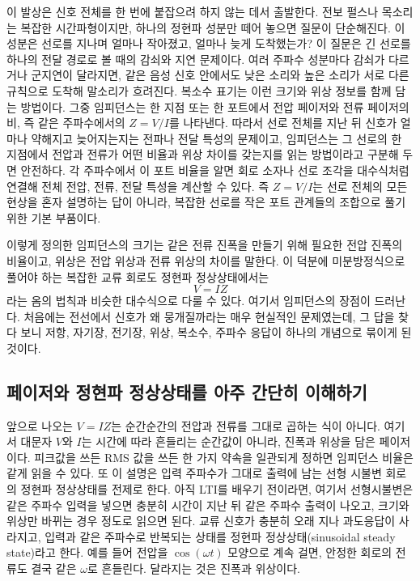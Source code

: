 이 발상은 신호 전체를 한 번에 붙잡으려 하지 않는 데서 출발한다.
전보 펄스나 목소리는 복잡한 시간파형이지만, 하나의 정현파 성분만 떼어 놓으면 질문이 단순해진다.
이 성분은 선로를 지나며 얼마나 작아졌고, 얼마나 늦게 도착했는가?
이 질문은 긴 선로를 하나의 전달 경로로 볼 때의 감쇠와 지연 문제이다.
여러 주파수 성분마다 감쇠가 다르거나 군지연이 달라지면, 같은 음성 신호 안에서도 낮은 소리와 높은 소리가 서로 다른 규칙으로 도착해 말소리가 흐려진다.
복소수 표기는 이런 크기와 위상 정보를 함께 담는 방법이다.
그중 임피던스는 한 지점 또는 한 포트에서 전압 페이저와 전류 페이저의 비, 즉 같은 주파수에서의 $Z=V/I$를 나타낸다.
따라서 선로 전체를 지난 뒤 신호가 얼마나 약해지고 늦어지는지는 전파나 전달 특성의 문제이고, 임피던스는 그 선로의 한 지점에서 전압과 전류가 어떤 비율과 위상 차이를 갖는지를 읽는 방법이라고 구분해 두면 안전하다.
각 주파수에서 이 포트 비율을 알면 회로 소자나 선로 조각을 대수식처럼 연결해 전체 전압, 전류, 전달 특성을 계산할 수 있다.
즉 $Z=V/I$는 선로 전체의 모든 현상을 혼자 설명하는 답이 아니라, 복잡한 선로를 작은 포트 관계들의 조합으로 풀기 위한 기본 부품이다.

이렇게 정의한 임피던스의 크기는 같은 전류 진폭을 만들기 위해 필요한 전압 진폭의 비율이고, 위상은 전압 위상과 전류 위상의 차이를 말한다.
이 덕분에 미분방정식으로 풀어야 하는 복잡한 교류 회로도 정현파 정상상태에서는
\begin{equation}
  V = IZ
\end{equation}
라는 옴의 법칙과 비슷한 대수식으로 다룰 수 있다.
여기서 임피던스의 장점이 드러난다.
처음에는 전선에서 신호가 왜 뭉개질까라는 매우 현실적인 문제였는데, 그 답을 찾다 보니 저항, 자기장, 전기장, 위상, 복소수, 주파수 응답이 하나의 개념으로 묶이게 된 것이다.

\subsection{페이저와 정현파 정상상태를 아주 간단히 이해하기}

앞으로 나오는 $V=IZ$는 순간순간의 전압과 전류를 그대로 곱하는 식이 아니다.
여기서 대문자 $V$와 $I$는 시간에 따라 흔들리는 순간값이 아니라, 진폭과 위상을 담은 페이저이다.
피크값을 쓰든 RMS 값을 쓰든 한 가지 약속을 일관되게 정하면 임피던스 비율은 같게 읽을 수 있다.
또 이 설명은 입력 주파수가 그대로 출력에 남는 선형 시불변 회로의 정현파 정상상태를 전제로 한다.
아직 LTI를 배우기 전이라면, 여기서 선형시불변은 같은 주파수 입력을 넣으면 충분히 시간이 지난 뒤 같은 주파수 출력이 나오고, 크기와 위상만 바뀌는 경우 정도로 읽으면 된다.
교류 신호가 충분히 오래 지나 과도응답이 사라지고, 입력과 같은 주파수로 반복되는 상태를 정현파 정상상태(sinusoidal steady state)라고 한다.
예를 들어 전압을 $\cos(\omega t)$ 모양으로 계속 걸면, 안정한 회로의 전류도 결국 같은 $\omega$로 흔들린다.
달라지는 것은 진폭과 위상이다.

